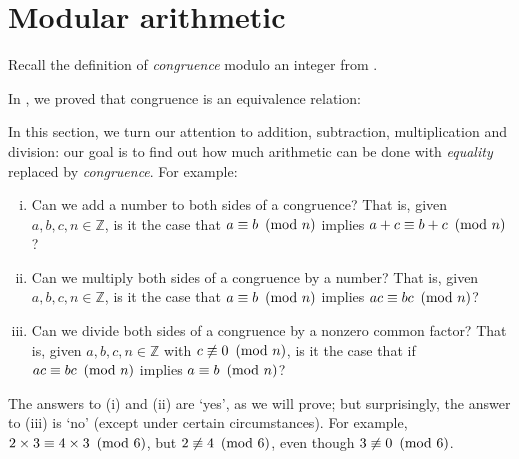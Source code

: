 \section{Modular arithmetic}

Recall the definition of \textit{congruence} modulo an integer from .

\rdefCongruence*

In , we proved that congruence is an equivalence relation:

\rthmCongruenceIsEquivalenceRelation*

In this section, we turn our attention to addition, subtraction, multiplication and division: our goal is to find out how much arithmetic can be done with \textit{equality} replaced by \textit{congruence}. For example:
\begin{enumerate}[(i)]
\item Can we add a number to both sides of a congruence? That is, given $a,b,c,n \in \mathbb{Z}$, is it the case that $a \equiv b ~\left(\text{mod}~n\right)$ implies $a + c \equiv b + c ~\left(\text{mod}~n\right)$?
\item Can we multiply both sides of a congruence by a number? That is, given $a,b,c,n \in \mathbb{Z}$, is it the case that $a \equiv b ~\left(\text{mod}~n\right)$ implies $ac \equiv bc ~\left(\text{mod}~n\right)$?
\item Can we divide both sides of a congruence by a nonzero common factor? That is, given $a,b,c,n \in \mathbb{Z}$ with $c \not\equiv 0 ~\left(\text{mod}~n\right)$, is it the case that if $ac \equiv bc ~\left(\text{mod}~n\right)$ implies $a \equiv b ~\left(\text{mod}~n\right)$?
\end{enumerate}

The answers to (i) and (ii) are `yes', as we will prove; but surprisingly, the answer to (iii) is `no' (except under certain circumstances). For example, $2 \times 3 \equiv 4 \times 3 ~\left(\text{mod}~6\right)$, but $2 \not\equiv 4 ~\left(\text{mod}~6\right)$, even though $3 \not\equiv 0 ~\left(\text{mod}~6\right)$.

